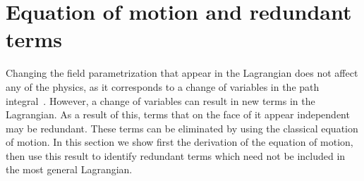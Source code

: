 \section{Equation of motion and redundant terms}

Changing the field parametrization that appear in the Lagrangian does not affect any of the physics, as it corresponds to a change of variables in the path integral~\cite{Scherer2002IntroductionTC,Chisholm:changeOfVar,Kamefuchi:changeOfVar}.
However, a change of variables can result in new terms in the Lagrangian.
As a result of this, terms that on the face of it appear independent may be redundant.
These terms can be eliminated by using the classical equation of motion.
In this section we show first the derivation of the equation of motion, then use this result to identify redundant terms which need not be included in the most general Lagrangian.

